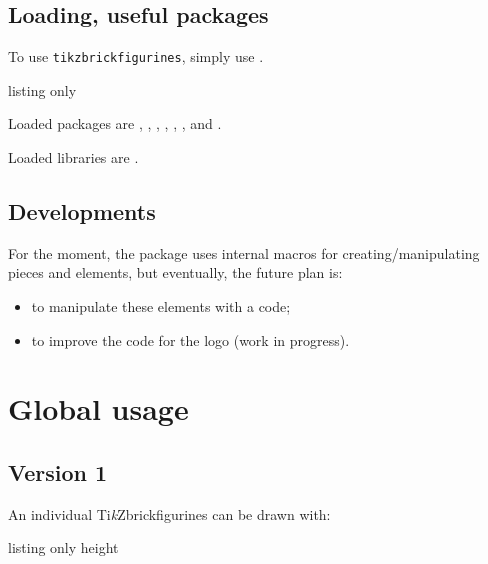 \documentclass[11pt,a4paper]{ltxdoc}
\providecommand*{\tikzbrickfigurines}{Ti\emph{k}Zbrickfigurines\xspace}
\begin{document}
\subsection{Loading, useful packages}

To use \texttt{tikzbrickfigurines}, simply use .

\begin{DemoCode}{listing only}
\usepackage{tikzbrickfigurines}
\end{DemoCode}

Loaded packages are , , , , , ,  and .

Loaded libraries are .

\subsection{Developments}

For the moment, the package uses internal macros for creating/manipulating pieces and elements, but eventually, the future plan is:

\begin{itemize}
	\item to manipulate these elements with a  code;
	\item to improve the code for the logo (work in progress).
\end{itemize}


\section{Global usage}

\subsection{Version 1}

An individual \tikzbrickfigurines can be drawn with:

\begin{DemoCode}{listing only}
%
  {height}
\end{DemoCode}

\begin{DemoCode}{}
\tikzbrickfigurine{1.5in}
\end{DemoCode}
\end{document}

